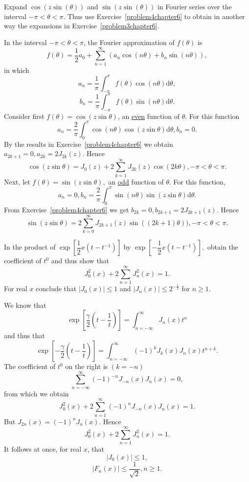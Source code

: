 \begin{problem}\label{problem5chapter6}
Expand $\cos(z \sin (\theta))$ and $\sin(z \sin(\theta))$ in Fourier series over the interval $-\pi < \theta < \pi$. Thus use Exercise~\ref{problem4chapter6} to obtain in another way the expansions in Exercise~\ref{problem3chapter6}.
\end{problem}
\begin{solution}
In the interval $-\pi < \theta < \pi$, the Fourier approximation of $f(\theta)$ is
$$f(\theta) = \dfrac{1}{2} a_0 + \displaystyle\sum_{n=1}^{\infty} (a_n \cos (n \theta) + b_n \sin(n \theta)),$$
in which
$$a_n = \dfrac{1}{\pi} \displaystyle\int_{-\pi}^{\pi} f(\theta) \cos(n \theta) \mathrm{d} \theta,$$
$$b_n = \dfrac{1}{\pi} \displaystyle\int_{-\pi}^{\pi} f(\theta) \sin(n \theta) \mathrm{d} \theta.$$
Consider first $f(\theta) = \cos(z \sin \theta)$, an \underline{even} function of $\theta$. For this function
$$a_n = \dfrac{2}{\pi} \displaystyle\int_0^{\pi} \cos(n \theta) \cos(z \sin \theta) \mathrm{d} \theta, b_n=0.$$
By the results in Exercise~\ref{problem4chapter6} we obtain $a_{2k+1}=0, a_{2k}=2 J_{2k}(z).$ Hence
$$\cos(z \sin \theta) = J_0(z) + 2 \displaystyle\sum_{k=1}^{\infty} J_{2k}(z) \cos(2k \theta), - \pi < \theta < \pi.$$
Next, let $f(\theta) = \sin(z \sin \theta),$ an \underline{odd} function of $\theta$. For this function,
$$a_n=0, b_n = \dfrac{2}{\pi} \displaystyle\int_0^{\pi} \sin(n \theta) \sin(z \sin \theta) \mathrm{d} \theta.$$
From Exercise~\ref{problem4chapter6} we get $b_{2k}=0, b_{2k+1}=2 J_{2k+1}(z)$. Hence
$$\sin(z \sin \theta) = 2 \displaystyle\sum_{k=0}^{\infty} J_{2k+1}(z) \sin((2k+1)\theta)), - \pi < \theta < \pi.$$
\end{solution}
\begin{problem}\label{problem6chapter6}
In the product of $\exp \left[ \dfrac{1}{2}x(t-t^{-1}) \right]$ by $\exp \left[ -\dfrac{1}{2} x(t-t^{-1}) \right],$ obtain the coefficient of $t^0$ and thus show that 
$$J_0^2(x) + 2 \displaystyle\sum_{n=1}^{\infty} J_n^2(x) = 1.$$
For real $x$ conclude that $|J_0(x)| \leq 1$ and $|J_n(x)| \leq 2^{-\frac{1}{2}}$ for $n \geq 1$.
\end{problem}
\begin{solution}
We know that 
$$\exp \left[ \dfrac{\gamma}{2} \left( t - \dfrac{1}{t} \right) \right] = \displaystyle\int_{n=-\infty}^{\infty} J_n(x) t^n$$
and thus that
$$\exp \left[ - \dfrac{\gamma}{2} \left( t - \dfrac{1}{t} \right) \right] = \displaystyle\int_{n=-\infty}^{\infty} (-1)^k J_k(x)J_n(x) t^{n+k}.$$
The coefficient of $t^0$ on the right is $(k=-n)$
$$\displaystyle\sum_{n=-\infty}^{\infty} (-1)^{-n} J_{-n}(x) J_n(x) = 0,$$
from which we obtain 
$$J_0^2(x) + 2 \displaystyle\sum_{n=1}^{\infty} (-1)^n J_{-n}(x) J_n(x) =1.$$
But $J_{2n}(x) = (-1)^n J_n(x).$ Hence
$$J_0^2(x) + 2 \displaystyle\sum_{n=1}^{\infty} J_n^2(x) = 1.$$
It follows at once, for real $x$, that
$$|J_0(x)| \leq 1,$$
$$|F_n(x)| \leq \dfrac{1}{\sqrt{2}}, n \geq 1.$$
\end{solution}
